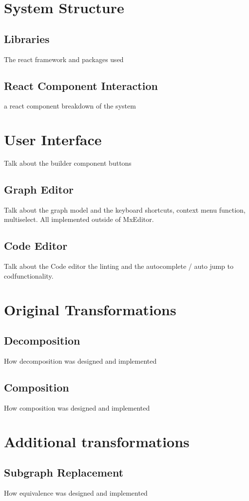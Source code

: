 \documentclass[bsc,frontabs,singlespacing,parskip,deptreport]{infthesis}
\begin{document}
\section{System Structure}
\subsection{Libraries}
The react framework and packages used
\subsection{React Component Interaction}
a react component breakdown of the system 
\section{User Interface}
Talk about the builder component buttons
\subsection{Graph Editor}
Talk about the graph model and the keyboard shortcuts, context menu function, multiselect. All implemented outside of MxEditor. 
\subsection{Code Editor}
Talk about the Code editor the linting and the autocomplete / auto jump to codfunctionality.  
\section{Original Transformations}
\subsection{Decomposition}
How decomposition was designed and implemented
\subsection{Composition}
How composition was designed and implemented

\section{Additional transformations}

\subsection{Subgraph Replacement}
How equivalence was designed and implemented
\end{document}
